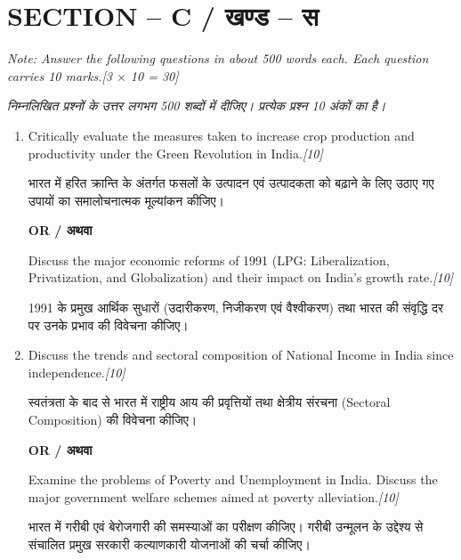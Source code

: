 \documentclass[11pt,a4paper]{article}
\newcommand{\pts}[1]{\hfill \textit{[#1]}}
\begin{document}
\bigskip

\section*{SECTION -- C / खण्ड -- स}
\noindent \textit{Note: Answer the following questions in about 500 words each. Each question carries 10 marks.}\pts{3 $\times$ 10 = 30}

\noindent \textit{निम्नलिखित प्रश्नों के उत्तर लगभग 500 शब्दों में दीजिए। प्रत्येक प्रश्न 10 अंकों का है।}

\begin{enumerate}[label=\textbf{\arabic*.},leftmargin=*,start=6,itemsep=14pt]

  \item Critically evaluate the measures taken to increase crop production and productivity under the Green Revolution in India.\pts{10}
  
  भारत में हरित क्रान्ति के अंतर्गत फसलों के उत्पादन एवं उत्पादकता को बढ़ाने के लिए उठाए गए उपायों का समालोचनात्मक मूल्यांकन कीजिए।

  \begin{center}\textbf{OR / अथवा}\end{center}

  Discuss the major economic reforms of 1991 (LPG: Liberalization, Privatization, and Globalization) and their impact on India's growth rate.\pts{10}
  
  1991 के प्रमुख आर्थिक सुधारों (उदारीकरण, निजीकरण एवं वैश्वीकरण) तथा भारत की संवृद्धि दर पर उनके प्रभाव की विवेचना कीजिए।

  \item Discuss the trends and sectoral composition of National Income in India since independence.\pts{10}
  
  स्वतंत्रता के बाद से भारत में राष्ट्रीय आय की प्रवृत्तियों तथा क्षेत्रीय संरचना (Sectoral Composition) की विवेचना कीजिए।

  \begin{center}\textbf{OR / अथवा}\end{center}

  Examine the problems of Poverty and Unemployment in India. Discuss the major government welfare schemes aimed at poverty alleviation.\pts{10}
  
  भारत में गरीबी एवं बेरोजगारी की समस्याओं का परीक्षण कीजिए। गरीबी उन्मूलन के उद्देश्य से संचालित प्रमुख सरकारी कल्याणकारी योजनाओं की चर्चा कीजिए।

\end{enumerate}
\end{document}
